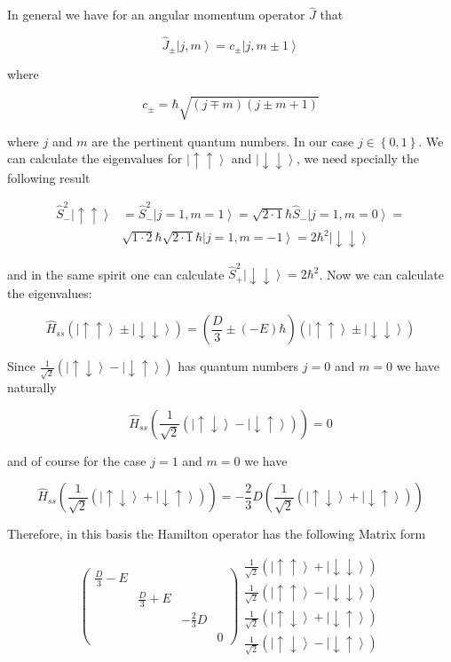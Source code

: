 \documentclass[A4paper, 12pt]{article}
\newcommand{\uu}{\left | \uparrow\uparrow \right \rangle}
\newcommand{\dd}{\left | \downarrow\downarrow \right \rangle}
\newcommand{\du}{\left | \downarrow\uparrow \right \rangle}
\newcommand{\ud}{\left | \uparrow\downarrow \right \rangle}
\newcommand{\mone}{\frac{1}{\sqrt{2}}\left( \ud + \du\right)}
\newcommand{\mmone}{\frac{1}{\sqrt{2}}\left( \ud - \du\right)}
\newcommand{\x}{\frac{1}{\sqrt 2}\left( \uu + \dd\right)}
\newcommand{\y}{\frac{1}{\sqrt 2}\left( \uu - \dd\right)}
\begin{document}
In general we have for an angular momentum operator $ \hat{J}  $ that

\begin{equation}
  \hat{J} _{\pm} \left | j, m \right \rangle = c _{\pm} \left | j,m \pm 1 \right \rangle
\end{equation}

where

\begin{equation}
  c _{\pm}  = \hbar \sqrt{(j\mp m)(j \pm m +1)}
\end{equation}

where $ j $ and $ m $ are the pertinent quantum numbers. In our case $ j \in \left \{0,1 \right \}  $.
We can calculate the eigenvalues for $ \uu $ and $ \dd $, we need specially the following result

\begin{align*}
  \hat{S} _{-} ^{2} \uu &=
  \hat{S} _{-} ^{2} \left | j=1, m=1 \right \rangle =
  \sqrt{2\cdot 1} \hbar \hat{S} _{-}  \left | j=1, m=0 \right \rangle = \\
  &
  \sqrt{1\cdot 2} \hbar  \sqrt{2\cdot 1} \hbar  \left | j=1, m=-1 \right \rangle =
  2\hbar ^{2} \dd
\end{align*}

and in the same spirit one can calculate $ \hat{S} _{+} ^{2} \dd = 2 \hbar ^{2}  $.
Now we can calculate the eigenvalues:

\begin{equation}
  \hat{H} _{ss} \left( \uu \pm \dd \right)
  =
  \left(
    \frac{D}{3}\pm (-E)\hbar
  \right)
  \left(
    \uu \pm \dd
  \right)
\end{equation}

Since $ \mmone $ has quantum numbers $ j=0 $ and $ m=0 $ we have naturally

\begin{equation*}
  \hat{H} _{ss} \left( \mmone \right) = 0
\end{equation*}

and of course for the case $ j=1 $ and $ m=0 $ we have

\begin{equation}
  \hat{H} _{ss} \left( \mone \right) = -\frac{2}{3}D \left( \mone \right)
\end{equation}

Therefore, in this basis the Hamilton operator has the following Matrix form

\begin{equation}
  \begin{pmatrix}
    \frac{D}{3} - E &                 &               &   \\
                    & \frac{D}{3} + E &               &   \\
                    &                 & -\frac{2}{3}D &   \\
                    &                 &               & 0
  \end{pmatrix}
  \begin{matrix}
    \x     \\
    \y     \\
    \mone  \\
    \mmone
  \end{matrix}
\end{equation}
\end{document}
